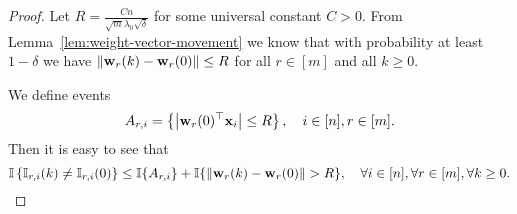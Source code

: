 \begin{proof}
	Let $R = \frac{C n }{\sqrt m \lambda_0 \sqrt{\delta}}$ for some universal constant $C>0$.
	From Lemma~\ref{lem:weight-vector-movement} we know that with probability at least $1-\delta$ we have $\left\|\mathbf{w}_r(k) - \mathbf{w}_r(0)\right\| \le R$ for all $r\in[m]$ and all $k \ge 0$.
	
	We define events
	\begin{equation} \label{eqn:A_{ri}-defn}
	A_{r, i} = \left\{ \left| \vect w_r(0)^\top \vect x_i \right| \le R \right\}, \quad i\in[n], r\in [m].
	\end{equation}
	Then it is easy to see that
	\begin{equation*}
	\mathbb{I}\left\{ \mathbb{I}_{r, i}(k) \not= \mathbb{I}_{r, i}(0) \right\} \le  \mathbb{I}\{A_{r, i}\} + \mathbb{I}\{ \left\|\mathbf{w}_r(k) - \mathbf{w}_r(0)\right\| > R \}  , \quad \forall i\in[n], \forall r\in[m], \forall k\ge0.
	\end{equation*}
	

\end{proof}

